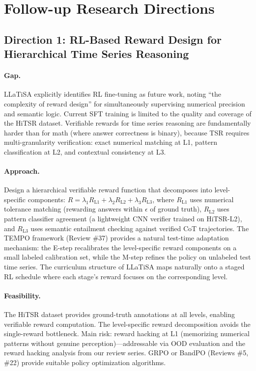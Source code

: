 \documentclass[11pt]{article}
\begin{document}
\section{Follow-up Research Directions}

\subsection{Direction 1: RL-Based Reward Design for Hierarchical Time Series Reasoning}

\paragraph{Gap.}
LLaTiSA explicitly identifies RL fine-tuning as future work, noting ``the complexity of reward design'' for simultaneously supervising numerical precision and semantic logic. Current SFT training is limited to the quality and coverage of the HiTSR dataset. Verifiable rewards for time series reasoning are fundamentally harder than for math (where answer correctness is binary), because TSR requires multi-granularity verification: exact numerical matching at L1, pattern classification at L2, and contextual consistency at L3.

\paragraph{Approach.}
Design a hierarchical verifiable reward function that decomposes into level-specific components: $R = \lambda_1 R_{\mathrm{L1}} + \lambda_2 R_{\mathrm{L2}} + \lambda_3 R_{\mathrm{L3}}$, where $R_{\mathrm{L1}}$ uses numerical tolerance matching (rewarding answers within $\epsilon$ of ground truth), $R_{\mathrm{L2}}$ uses pattern classifier agreement (a lightweight CNN verifier trained on HiTSR-L2), and $R_{\mathrm{L3}}$ uses semantic entailment checking against verified CoT trajectories. The TEMPO framework (Review \#37) provides a natural test-time adaptation mechanism: the E-step recalibrates the level-specific reward components on a small labeled calibration set, while the M-step refines the policy on unlabeled test time series. The curriculum structure of LLaTiSA maps naturally onto a staged RL schedule where each stage's reward focuses on the corresponding level.

\paragraph{Feasibility.}
The HiTSR dataset provides ground-truth annotations at all levels, enabling verifiable reward computation. The level-specific reward decomposition avoids the single-reward bottleneck. Main risk: reward hacking at L1 (memorizing numerical patterns without genuine perception)---addressable via OOD evaluation and the reward hacking analysis from our review series. GRPO or BandPO (Reviews \#5, \#22) provide suitable policy optimization algorithms.
\end{document}
